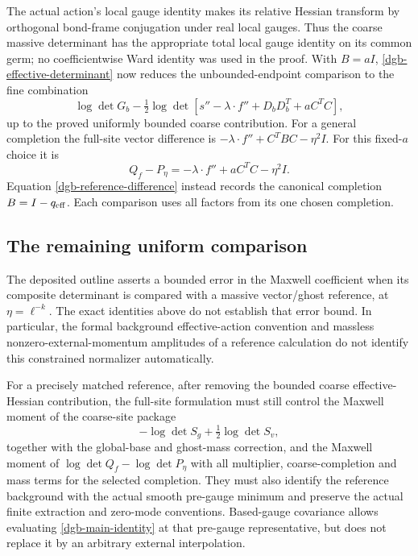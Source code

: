 The actual action's local gauge identity makes its
relative Hessian transform by orthogonal bond-frame
conjugation under real local gauges. Thus the coarse
massive determinant has the appropriate total local
gauge identity on its common germ; no coefficientwise
Ward identity was used in the proof.
With $B=aI$, \eqref{dgb-effective-determinant} now reduces
the unbounded-endpoint comparison to the fine combination
\[
 \log\det G_b-\tfrac12\log\det\!
       \left[s''-\lambda\cdot f''
                     +D_bD_b^T+aC^TC\right],
\]
up to the proved uniformly bounded coarse contribution.
For a general completion the full-site vector difference
is $-\lambda\cdot f''+C^TBC-\eta^2I$. For this fixed-$a$
choice it is
\begin{equation}
              Q_f-P_\eta
                    =-\lambda\cdot f''+aC^TC-\eta^2I.
 \label{dgb-fixed-a-difference}
\end{equation}
Equation \eqref{dgb-reference-difference} instead records
the canonical completion $B=I-q_{\rm eff}$.
Each comparison uses all factors from its one chosen
completion.

\subsection{The remaining uniform comparison}
\label{dgb-scope-section}

The deposited outline asserts a bounded error in the
Maxwell coefficient when its composite determinant is
compared with a massive vector/ghost reference, at
$\eta=\ell^{-k}$. The exact identities above do not
establish that error bound. In particular, the formal
background effective-action convention and massless
nonzero-external-momentum amplitudes of a reference
calculation do not identify this constrained normalizer
automatically.

For a precisely matched reference, after removing the
bounded coarse effective-Hessian contribution, the
full-site formulation must still control the Maxwell
moment of the coarse-site package
\[
                         -\log\det S_g+\tfrac12\log\det S_v,
\]
together with the global-base and ghost-mass correction,
and the Maxwell moment of
$\log\det Q_f-\log\det P_\eta$ with all multiplier,
coarse-completion and mass terms for the selected
completion. They must also identify
the reference background with the actual smooth pre-gauge
minimum and preserve the actual finite extraction and
zero-mode conventions. Based-gauge covariance allows
evaluating \eqref{dgb-main-identity} at that pre-gauge
representative, but does not replace it by an arbitrary
external interpolation.

